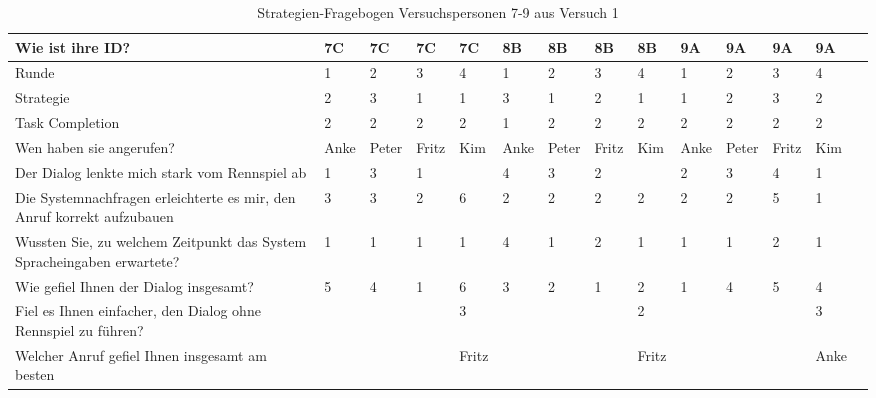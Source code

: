 \documentclass[12pt,a4paper]{scrartcl}
\begin{document}
\begin{appendix}
\begin{table}
\caption{Strategien-Fragebogen Versuchspersonen 7-9 aus Versuch 1}
\begin{tabular}{|p{6cm}| p{0.8cm} | p{0.8cm} | p{0.8cm} | p{0.8cm} || p{0.8cm} | p{0.8cm} | p{0.8cm} | p{0.8cm} || p{0.8cm} | p{0.8cm} | p{0.8cm} | p{0.8cm} | p{} | }
\hline
	Wie ist ihre ID? & 7C & 7C & 7C & 7C & 8B & 8B & 8B & 8B & 9A & 9A & 9A & 9A \\ \hline \hline
	Runde & 1 & 2 & 3 & 4 & 1 & 2 & 3 & 4 & 1 & 2 & 3 & 4 \\ \hline
	Strategie & 2 & 3 & 1 & 1 & 3 & 1 & 2 & 1 & 1 & 2 & 3 & 2 \\ \hline \hline
	Task Completion & 2 & 2 & 2 & 2 & 1 & 2 & 2 & 2 & 2 & 2 & 2 & 2 \\ \hline \hline
	Wen haben sie angerufen? & Anke & Peter & Fritz & Kim & Anke & Peter & Fritz & Kim & Anke & Peter & Fritz & Kim \\ \hline
	Der Dialog lenkte mich stark vom Rennspiel ab & 1 & 3 & 1 &  & 4 & 3 & 2 &  & 2 & 3 & 4 & 1 \\ \hline
	Die Systemnachfragen erleichterte es mir, den Anruf korrekt aufzubauen & 3 & 3 & 2 & 6 & 2 & 2 & 2 & 2 & 2 & 2 & 5 & 1 \\ \hline
	Wussten Sie, zu welchem Zeitpunkt das System Spracheingaben erwartete? & 1 & 1 & 1 & 1 & 4 & 1 & 2 & 1 & 1 & 1 & 2 & 1 \\ \hline
	Wie gefiel Ihnen der Dialog insgesamt? & 5 & 4 & 1 & 6 & 3 & 2 & 1 & 2 & 1 & 4 & 5 & 4 \\ \hline
	Fiel es Ihnen einfacher, den Dialog ohne Rennspiel zu führen? &  &  &  & 3 &  &  &  & 2 &  &  &  & 3 \\ \hline
	Welcher Anruf gefiel Ihnen insgesamt am besten &  &  &  & Fritz &  &  &  & Fritz &  &  &  & Anke \\ \hline
\end{tabular}
\end{table}


\end{appendix}
\end{document}
